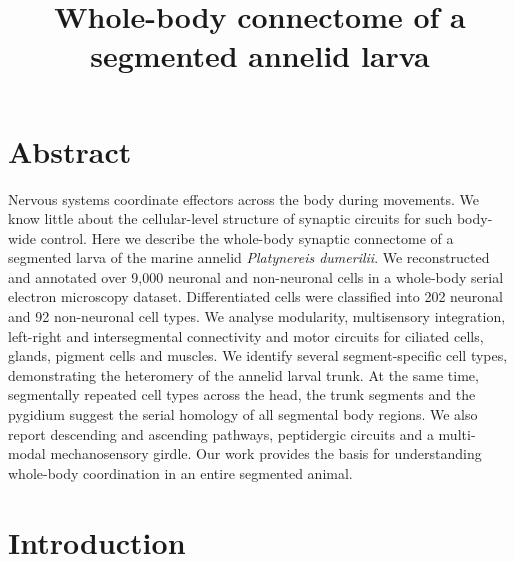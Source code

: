 \documentclass[
  11pt,
]{article}
\title{Whole-body connectome of a segmented annelid larva}
\subtitle{\raggedright

Csaba Verasztó\textsuperscript{1,2†}, Sanja
Jasek\textsuperscript{1,3,†}, Martin Gühmann\textsuperscript{4}, Luis
Alberto Bezares-Calderón\textsuperscript{1}, Elizabeth A.
Williams\textsuperscript{5}, Réza Shahidi\textsuperscript{6}, Gáspár
Jékely\textsuperscript{1,3,*} \newline\textsuperscript{1}Living Systems
Institute, University of Exeter, Exeter, EX4 4QD, United Kingdom
\newline\textsuperscript{2}École Polytechnique Fédérale de Lausanne
(EPFL), Lausanne, Switzerland, \textsuperscript{3}Heidelberg University,
Centre for Organismal Studies (COS), 69120 Heidelberg, Germany \newline
\newline\textsuperscript{4}School of Biological Sciences, University of
Bristol, Bristol, United Kingdom \newline\textsuperscript{5}BioSciences,
University of Exeter, Stocker Road, Exeter EX4 4QD, Exeter, United
Kingdom\newline \textsuperscript{6}Electron Microscopy Core Facility
(EMCF), University of Heidelberg, 69120 Heidelberg, Germany \newline
\textsuperscript{*}Correspondence: gaspar.jekely@cos.uni-heidelberg.de
\newline \textsuperscript{†}These authors contributed equally to this
work}
\author{}
\date{}
\renewcommand*\contentsname{Table of contents}
\newcommand\contentsname{Table of contents}
\begin{document}
\maketitle

\linenumbers

\renewcommand*\contentsname{Table of contents}
{
\hypersetup{linkcolor=}
\setcounter{tocdepth}{3}
\tableofcontents
}
\section{Abstract}\label{abstract}

Nervous systems coordinate effectors across the body during movements.
We know little about the cellular-level structure of synaptic circuits
for such body-wide control. Here we describe the whole-body synaptic
connectome of a segmented larva of the marine annelid \emph{Platynereis
dumerilii}. We reconstructed and annotated over 9,000 neuronal and
non-neuronal cells in a whole-body serial electron microscopy dataset.
Differentiated cells were classified into 202 neuronal and 92
non-neuronal cell types. We analyse modularity, multisensory
integration, left-right and intersegmental connectivity and motor
circuits for ciliated cells, glands, pigment cells and muscles. We
identify several segment-specific cell types, demonstrating the
heteromery of the annelid larval trunk. At the same time, segmentally
repeated cell types across the head, the trunk segments and the pygidium
suggest the serial homology of all segmental body regions. We also
report descending and ascending pathways, peptidergic circuits and a
multi-modal mechanosensory girdle. Our work provides the basis for
understanding whole-body coordination in an entire segmented animal.

\section{Introduction}\label{introduction}
\end{document}
